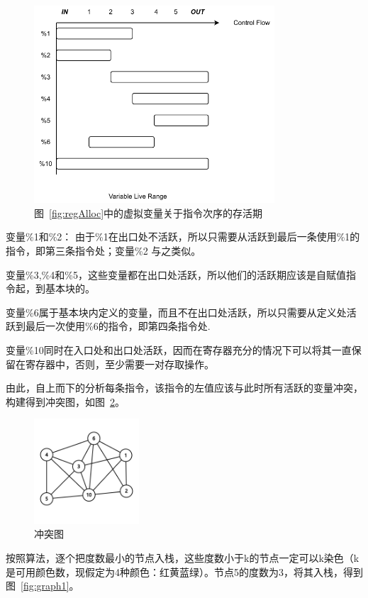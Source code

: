 \begin{figure}[htb]
  \centering
  \includegraphics[width=0.8\textwidth]{figures/reg_live_range.pdf}
  \caption{图~\ref{fig:regAlloc}中的虚拟变量关于指令次序的存活期}
  \label{fig:regAllocLiveRange}
\end{figure}

变量\%1和\%2： 由于\%1在出口处不活跃，所以只需要从活跃到最后一条使用\%1的指令，即第三条指令处；变量\%2 与之类似。

变量\%3,\%4和\%5，这些变量都在出口处活跃，所以他们的活跃期应该是自赋值指令起，到基本块的。

变量\%6属于基本块内定义的变量，而且不在出口处活跃，所以只需要从定义处活跃到最后一次使用\%6的指令，即第四条指令处.

变量\%10同时在入口处和出口处活跃，因而在寄存器充分的情况下可以将其一直保留在寄存器中，否则，至少需要一对存取操作。

由此，自上而下的分析每条指令，该指令的左值应该与此时所有活跃的变量冲突，构建得到冲突图，如图~\ref{fig:graph0}。

\begin{figure}[htb]
  \centering
  \includegraphics[width=0.35\textwidth]{figures/graph.png}
  \caption{冲突图}
  \label{fig:graph0}
\end{figure}
按照算法，逐个把度数最小的节点入栈，这些度数小于k的节点一定可以k染色（k是可用颜色数，现假定为4种颜色：红黄蓝绿）。节点5的度数为3，将其入栈，得到图~\ref{fig:graph1}。

